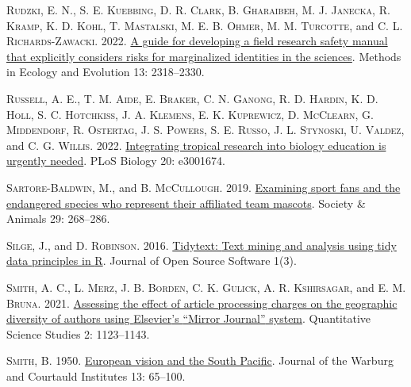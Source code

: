 \documentclass[
  12pt,
  man, donotrepeattitle,floatsintext]{apa6}
\newlength{\cslhangindent}
\newlength{\cslentryspacingunit} %
\newenvironment{CSLReferences}[2] %
 {%
  \setlength{\parindent}{0pt}
  \ifodd #1
  \let\oldpar\par
  \def\par{\hangindent=\cslhangindent\oldpar}
  \fi
  \setlength{\parskip}{#2\cslentryspacingunit}
 }%
 {}
\begin{document}
\begin{CSLReferences}{1}{0}
\leavevmode{}%
\textsc{Rudzki, E. N.}, \textsc{S. E. Kuebbing}, \textsc{D. R. Clark}, \textsc{B. Gharaibeh}, \textsc{M. J. Janecka}, \textsc{R. Kramp}, \textsc{K. D. Kohl}, \textsc{T. Mastalski}, \textsc{M. E. B. Ohmer}, \textsc{M. M. Turcotte}, and \textsc{C. L. Richards-Zawacki}. 2022. \href{https://doi.org/10.1111/2041-210X.13970}{A guide for developing a field research safety manual that explicitly considers risks for marginalized identities in the sciences}. Methods in Ecology and Evolution 13: 2318--2330.

\leavevmode{}%
\textsc{Russell, A. E.}, \textsc{T. M. Aide}, \textsc{E. Braker}, \textsc{C. N. Ganong}, \textsc{R. D. Hardin}, \textsc{K. D. Holl}, \textsc{S. C. Hotchkiss}, \textsc{J. A. Klemens}, \textsc{E. K. Kuprewicz}, \textsc{D. McClearn}, \textsc{G. Middendorf}, \textsc{R. Ostertag}, \textsc{J. S. Powers}, \textsc{S. E. Russo}, \textsc{J. L. Stynoski}, \textsc{U. Valdez}, and \textsc{C. G. Willis}. 2022. \href{https://doi.org/10.1371/journal.pbio.3001674}{Integrating tropical research into biology education is urgently needed}. PLoS Biology 20: e3001674.

\leavevmode{}%
\textsc{Sartore-Baldwin, M.}, and \textsc{B. McCullough}. 2019. \href{https://doi.org/10.1163/15685306-12341605}{Examining sport fans and the endangered species who represent their affiliated team mascots}. Society \& Animals 29: 268--286.

\leavevmode{}%
\textsc{Silge, J.}, and \textsc{D. Robinson}. 2016. \href{https://doi.org/10.21105/joss.00037}{Tidytext: {Text} mining and analysis using tidy data principles in {R}}. Journal of Open Source Software 1(3).

\leavevmode{}%
\textsc{Smith, A. C.}, \textsc{L. Merz}, \textsc{J. B. Borden}, \textsc{C. K. Gulick}, \textsc{A. R. Kshirsagar}, and \textsc{E. M. Bruna}. 2021. \href{https://doi.org/10.1162/qss_a_00157}{Assessing the effect of article processing charges on the geographic diversity of authors using {Elsevier}'s {``{Mirror Journal}''} system}. Quantitative Science Studies 2: 1123--1143.

\leavevmode{}%
\textsc{Smith, B.} 1950. \href{https://doi.org/10.2307/750143}{European vision and the {South Pacific}}. Journal of the Warburg and Courtauld Institutes 13: 65--100.


\end{CSLReferences}
\end{document}
